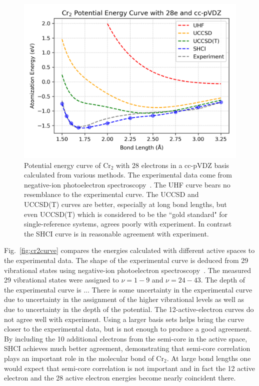 \begin{figure}
  \begin{center}
  \includegraphics[width=0.9\linewidth]{figs/hfcc.png}
  \caption{Potential energy curve of Cr$_2$ with 28 electrons in a cc-pVDZ basis calculated from various methods.
  The experimental data come from negative-ion photoelectron spectroscopy~\cite{casey1993negative}.
  The UHF curve bears no resemblance to the experimental curve.
  The UCCSD and UCCSD(T) curves are better, especially at long bond lengths, but even UCCSD(T) which is considered to be the ``gold standard" for single-reference
  systems, agrees poorly with experiment.  In contrast the SHCI curve is in reasonable agreement with experiment.
}
  \label{fig:hfcc}
  \end{center}
\end{figure}

Fig.~\ref{fig:cr2curve} compares the energies calculated with different active spaces to the experimental data.
The shape of the experimental curve is deduced from 29 vibrational states using negative-ion photoelectron spectroscopy~\cite{casey1993negative}.
The measured 29 vibrational states were assigned to $\nu=1-9$ and $\nu=24-43$.
The depth of the experimental curve is ...
There is some uncertainty in the experimental curve due to uncertainty in the assignment of the higher vibrational levels
as well as due to uncertainty in the depth of the potential.
The 12-active-electron curves do not agree well with experiment.
Using a larger basis sets helps bring the curve closer to the experimental data, but is not enough to produce a good agreement.
By including the 10 additional electrons from the semi-core in the active space, SHCI achieves much better agreement,
demonstrating that semi-core correlation plays an important role in the molecular bond of Cr$_2$.
At large bond lengths one would expect that semi-core correlation is not important and in fact the 12 active electron
and the 28 active electron energies become nearly coincident there.

